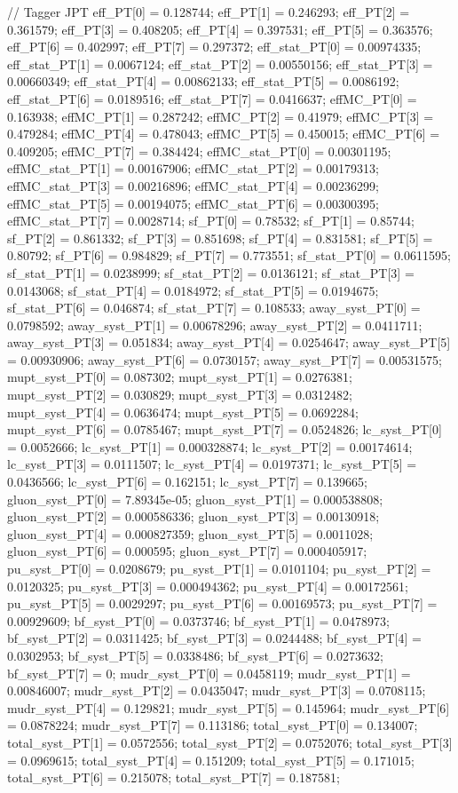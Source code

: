 // Tagger JPT
eff_PT[0] = 0.128744; eff_PT[1] = 0.246293; eff_PT[2] = 0.361579; 
eff_PT[3] = 0.408205; eff_PT[4] = 0.397531; eff_PT[5] = 0.363576; 
eff_PT[6] = 0.402997; eff_PT[7] = 0.297372; 
eff_stat_PT[0] = 0.00974335; eff_stat_PT[1] = 0.0067124; eff_stat_PT[2] = 0.00550156; 
eff_stat_PT[3] = 0.00660349; eff_stat_PT[4] = 0.00862133; eff_stat_PT[5] = 0.0086192; 
eff_stat_PT[6] = 0.0189516; eff_stat_PT[7] = 0.0416637; 
effMC_PT[0] = 0.163938; effMC_PT[1] = 0.287242; effMC_PT[2] = 0.41979; 
effMC_PT[3] = 0.479284; effMC_PT[4] = 0.478043; effMC_PT[5] = 0.450015; 
effMC_PT[6] = 0.409205; effMC_PT[7] = 0.384424; 
effMC_stat_PT[0] = 0.00301195; effMC_stat_PT[1] = 0.00167906; effMC_stat_PT[2] = 0.00179313; 
effMC_stat_PT[3] = 0.00216896; effMC_stat_PT[4] = 0.00236299; effMC_stat_PT[5] = 0.00194075; 
effMC_stat_PT[6] = 0.00300395; effMC_stat_PT[7] = 0.0028714; 
sf_PT[0] = 0.78532; sf_PT[1] = 0.85744; sf_PT[2] = 0.861332; 
sf_PT[3] = 0.851698; sf_PT[4] = 0.831581; sf_PT[5] = 0.80792; 
sf_PT[6] = 0.984829; sf_PT[7] = 0.773551; 
sf_stat_PT[0] = 0.0611595; sf_stat_PT[1] = 0.0238999; sf_stat_PT[2] = 0.0136121; 
sf_stat_PT[3] = 0.0143068; sf_stat_PT[4] = 0.0184972; sf_stat_PT[5] = 0.0194675; 
sf_stat_PT[6] = 0.046874; sf_stat_PT[7] = 0.108533; 
away_syst_PT[0] = 0.0798592; away_syst_PT[1] = 0.00678296; away_syst_PT[2] = 0.0411711; 
away_syst_PT[3] = 0.051834; away_syst_PT[4] = 0.0254647; away_syst_PT[5] = 0.00930906; 
away_syst_PT[6] = 0.0730157; away_syst_PT[7] = 0.00531575; 
mupt_syst_PT[0] = 0.087302; mupt_syst_PT[1] = 0.0276381; mupt_syst_PT[2] = 0.030829; 
mupt_syst_PT[3] = 0.0312482; mupt_syst_PT[4] = 0.0636474; mupt_syst_PT[5] = 0.0692284; 
mupt_syst_PT[6] = 0.0785467; mupt_syst_PT[7] = 0.0524826; 
lc_syst_PT[0] = 0.0052666; lc_syst_PT[1] = 0.000328874; lc_syst_PT[2] = 0.00174614; 
lc_syst_PT[3] = 0.0111507; lc_syst_PT[4] = 0.0197371; lc_syst_PT[5] = 0.0436566; 
lc_syst_PT[6] = 0.162151; lc_syst_PT[7] = 0.139665; 
gluon_syst_PT[0] = 7.89345e-05; gluon_syst_PT[1] = 0.000538808; gluon_syst_PT[2] = 0.000586336; 
gluon_syst_PT[3] = 0.00130918; gluon_syst_PT[4] = 0.000827359; gluon_syst_PT[5] = 0.0011028; 
gluon_syst_PT[6] = 0.000595; gluon_syst_PT[7] = 0.000405917; 
pu_syst_PT[0] = 0.0208679; pu_syst_PT[1] = 0.0101104; pu_syst_PT[2] = 0.0120325; 
pu_syst_PT[3] = 0.000494362; pu_syst_PT[4] = 0.00172561; pu_syst_PT[5] = 0.0029297; 
pu_syst_PT[6] = 0.00169573; pu_syst_PT[7] = 0.00929609; 
bf_syst_PT[0] = 0.0373746; bf_syst_PT[1] = 0.0478973; bf_syst_PT[2] = 0.0311425; 
bf_syst_PT[3] = 0.0244488; bf_syst_PT[4] = 0.0302953; bf_syst_PT[5] = 0.0338486; 
bf_syst_PT[6] = 0.0273632; bf_syst_PT[7] = 0; 
mudr_syst_PT[0] = 0.0458119; mudr_syst_PT[1] = 0.00846007; mudr_syst_PT[2] = 0.0435047; 
mudr_syst_PT[3] = 0.0708115; mudr_syst_PT[4] = 0.129821; mudr_syst_PT[5] = 0.145964; 
mudr_syst_PT[6] = 0.0878224; mudr_syst_PT[7] = 0.113186; 
total_syst_PT[0] = 0.134007; total_syst_PT[1] = 0.0572556; total_syst_PT[2] = 0.0752076; 
total_syst_PT[3] = 0.0969615; total_syst_PT[4] = 0.151209; total_syst_PT[5] = 0.171015; 
total_syst_PT[6] = 0.215078; total_syst_PT[7] = 0.187581; 



